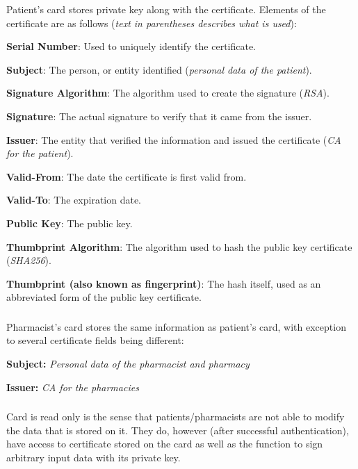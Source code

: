 Patient's card stores private key along with the certificate. Elements of the certificate are as follows ({\it text in parentheses describes what is used}):
\begin{packed_enum}
 \item {\bf Serial Number}: Used to uniquely identify the certificate.
 \item {\bf Subject}: The person, or entity identified ({\it personal data of the patient}).
 \item {\bf Signature Algorithm}: The algorithm used to create the signature ({\it RSA}).
 \item {\bf Signature}: The actual signature to verify that it came from the issuer.
 \item {\bf Issuer}: The entity that verified the information and issued the certificate ({\it CA for the patient}).
 \item {\bf Valid-From}: The date the certificate is first valid from.
 \item {\bf Valid-To}: The expiration date.
 \item {\bf Public Key}: The public key.
 \item {\bf Thumbprint Algorithm}: The algorithm used to hash the public key certificate ({\it SHA256}).
 \item {\bf Thumbprint (also known as fingerprint)}: The hash itself, used as an abbreviated form of the public key certificate.
\end{packed_enum}

\subsubsection{}

Pharmacist's card stores the same information as patient's card, with exception to several certificate fields being different:
\begin{packed_enum}
 \item {\bf Subject:} {\it Personal data of the pharmacist and pharmacy}
 \item {\bf Issuer:} {\it CA for the pharmacies}
\end{packed_enum}

\subsubsection{}

Card is read only is the sense that patients/pharmacists are not able to modify the data that is stored on it. They do, however (after successful authentication), have access to certificate stored on the card as well as the function to sign arbitrary input data with its private key.

